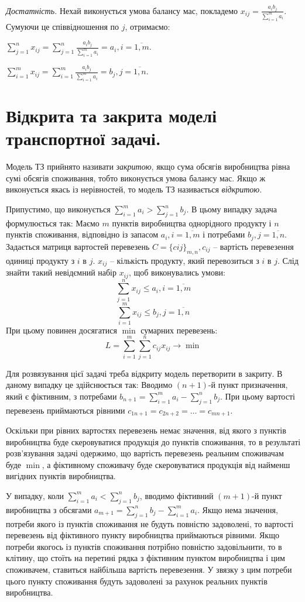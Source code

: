 \documentclass[12pt,a4paper]{report}
\begin{document}
{\it Достатність.} Нехай виконується умова балансу мас, покладемо  $x_{ij} = \frac{a_ib_j}{\sum_{i=1}^m a_i}$. Сумуючи це співвідношення по $j$, отримаємо:

$\sum_{j=1}^n x_{ij} = \sum_{j=1}^n \frac{a_ib_j}{\sum_{i=1}^m a_i} = a_i,  i = \overline{1, m}.$

$\sum_{i=1}^m x_{ij} = \sum_{i=1}^m \frac{a_ib_j}{\sum_{i=1}^m a_i} = b_j,  j = \overline{1, n}.$

\clearpage

\chapter{Відкрита та закрита моделі транспортної задачі.}

Модель ТЗ прийнято називати \emph{закритою}, якщо сума обсягів виробництва рівна сумі обсягів споживання, тобто виконується умова балансу мас. Якщо ж виконується якась із нерівностей, то модель ТЗ називається \emph{відкритою}.

Припустимо, що виконується $\sum_{i=1}^m a_i > \sum_{j=1}^n b_j$. В цьому випадку задача формулюється так:
Маємо $m$ пунктів виробництва однорідного продукту і $n$ пунктів споживання, відповідно із запасом $a_i, i=\overline{1,m}$ і потребами $b_j, j=\overline{1,n}$. Задається матриця вартостей перевезень $C=\{cij\}_{m,n}, c_{ij}$ – вартість перевезення одиниці продукту з $i$ в $j$. $x_{ij}$ – кількість продукту, який перевозиться з $i$ в $j$.
Слід знайти такий невідємний набір $x_{ij}$, щоб виконувались умови:
\[ \sum_{j=1}^n x_{ij} \leq a_i, i=\overline{1,m} \]
\[ \sum_{i=1}^m x_{ij} \leq b_j, j=\overline{1,n} \]
При цьому повинен досягатися $\min$ сумарних перевезень:
\[ L = \sum_{i=1}^m \sum_{j=1}^n c_{ij} x_{ij} \to \min \]

Для розвязування цієї задачі треба відкриту модель перетворити в закриту. В даному випадку це здійснюється так:
Вводимо $(n+1)$-й пункт призначення, який є фіктивним, з потребами $b_{n+1} = \sum_{i=1}^m a_i - \sum_{j=1}^n b_j$. При цьому вартості перевезень приймаються рівними $c_{1 n+1} = c_{2 n+2} = \dots = c_{m n+1}$.

Оскільки при рівних вартостях перевезень немає значення, від якого з пунктів виробництва буде скеровуватися продукція до пунктів споживання, то в результаті розв’язування задачі одержимо, що вартість перевезень реальним споживачам буде $\min$, а фіктивному споживачу буде скеровуватися продукція від найменш вигідних пунктів виробництва.

У випадку, коли $\sum_{i=1}^m a_i < \sum_{j=1}^n b_j$, вводимо фіктивний $(m+1)$-й пункт виробництва з обсягами $a_{m+1} = \sum_{j=1}^n b_j - \sum_{i=1}^m a_i$. Якщо нема значення, потреби якого із пунктів споживання не будуть повністю задоволені, то вартості перевезень від фіктивного пункту виробництва приймаються рівними. Якщо потреби якогось із пунктів споживання потрібно повністю задовільнити, то в клітину, що стоїть на перетині рядка з фіктивним пунктом виробництва і цим споживачем, ставиться найбільша вартість перевезення. У звязку з цим потреби цього пункту споживання будуть задоволені за рахунок реальних пунктів виробництва.
\end{document}

